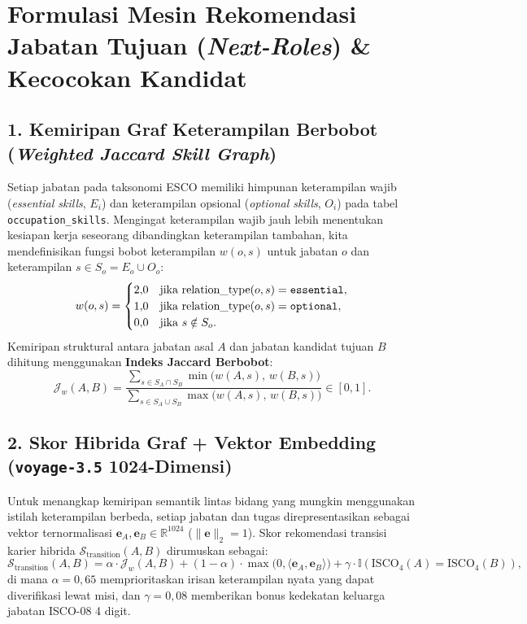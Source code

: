 \documentclass[11pt,a4paper]{report}
\begin{document}
\section{Formulasi Mesin Rekomendasi Jabatan Tujuan (\textit{Next-Roles}) \& Kecocokan Kandidat}

\subsection{1. Kemiripan Graf Keterampilan Berbobot (\textit{Weighted Jaccard Skill Graph})}
Setiap jabatan pada taksonomi ESCO memiliki himpunan keterampilan wajib (\textit{essential skills}, $E_i$) dan keterampilan opsional (\textit{optional skills}, $O_i$) pada tabel \texttt{occupation\_skills}. Mengingat keterampilan wajib jauh lebih menentukan kesiapan kerja seseorang dibandingkan keterampilan tambahan, kita mendefinisikan fungsi bobot keterampilan $w(o, s)$ untuk jabatan $o$ dan keterampilan $s \in S_o = E_o \cup O_o$:
\[
w(o, s) =
\begin{cases}
2{,}0 & \text{jika } \text{relation\_type}(o, s) = \text{\texttt{essential}}, \\
1{,}0 & \text{jika } \text{relation\_type}(o, s) = \text{\texttt{optional}}, \\
0{,}0 & \text{jika } s \notin S_o.
\end{cases}
\]
Kemiripan struktural antara jabatan asal $A$ dan jabatan kandidat tujuan $B$ dihitung menggunakan \textbf{Indeks Jaccard Berbobot}:
\[
\mathcal{J}_w(A, B) = \frac{\sum_{s \in S_A \cap S_B} \min\!\big(w(A, s),\, w(B, s)\big)}{\sum_{s \in S_A \cup S_B} \max\!\big(w(A, s),\, w(B, s)\big)} \in [0, 1].
\]

\subsection{2. Skor Hibrida Graf + Vektor Embedding (\texttt{voyage-3.5} 1024-Dimensi)}
Untuk menangkap kemiripan semantik lintas bidang yang mungkin menggunakan istilah keterampilan berbeda, setiap jabatan dan tugas direpresentasikan sebagai vektor ternormalisasi $\mathbf{e}_A, \mathbf{e}_B \in \mathbb{R}^{1024}$ ($\|\mathbf{e}\|_2 = 1$). Skor rekomendasi transisi karier hibrida $\mathcal{S}_{\text{transition}}(A, B)$ dirumuskan sebagai:
\[
\mathcal{S}_{\text{transition}}(A, B) = \alpha \cdot \mathcal{J}_w(A, B) + (1 - \alpha) \cdot \max\!\big(0, \langle \mathbf{e}_A, \mathbf{e}_B \rangle\big) + \gamma \cdot \mathbb{I}(\text{ISCO}_4(A) = \text{ISCO}_4(B)),
\]
di mana $\alpha = 0{,}65$ memprioritaskan irisan keterampilan nyata yang dapat diverifikasi lewat misi, dan $\gamma = 0{,}08$ memberikan bonus kedekatan keluarga jabatan ISCO-08 4 digit.
\end{document}
